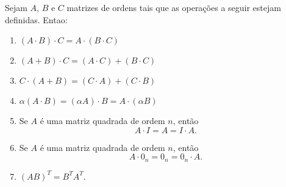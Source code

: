 \begin{proposicao}
  Sejam $A$, $B$ e $C$ matrizes de ordens tais que as operações a seguir estejam definidas. Entao:
  \begin{enumerate}[label={\roman*})]
    \item $(A\cdot B)\cdot C = A\cdot(B \cdot C)$
    \item $(A + B)\cdot C = (A\cdot C) + (B\cdot C)$
    \item $C\cdot(A + B) = (C\cdot A) + (C\cdot B)$
    \item $\alpha(A\cdot B) = (\alpha A)\cdot B = A \cdot(\alpha B)$
    \item Se $A$ é uma matriz quadrada de ordem $n$, então
      \[A\cdot I = A = I\cdot A.\]
    \item Se $A$ é uma matriz quadrada de ordem $n$, então
      \[A\cdot0_n = 0_n = 0_n\cdot A.\]
    \item $(AB)^T = B^TA^T$.
  \end{enumerate}
\end{proposicao}
